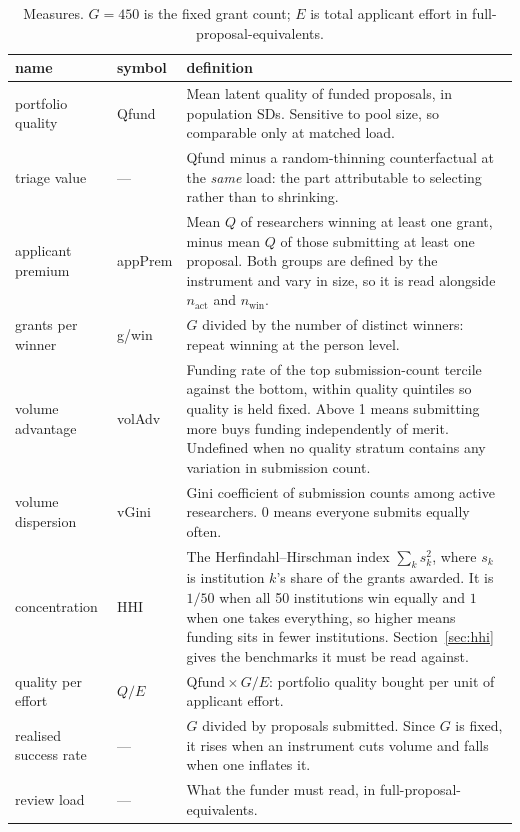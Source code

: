 \documentclass[11pt,a4paper]{article}
\begin{document}
\begin{table}[!htbp]
\centering
\small
\caption{Measures. $G=450$ is the fixed grant count; $E$ is total applicant
effort in full-proposal-equivalents.}
\label{tab:metrics}
\begin{tabular}{ll p{9.4cm}}
\toprule
name & symbol & definition \\
\midrule
portfolio quality & Qfund
  & Mean latent quality of funded proposals, in population SDs. Sensitive to
    pool size, so comparable only at matched load. \\
triage value & ---
  & Qfund minus a random-thinning counterfactual at the \emph{same} load: the
    part attributable to selecting rather than to shrinking. \\
applicant premium & appPrem
  & Mean $Q$ of researchers winning at least one grant, minus mean $Q$ of those
    submitting at least one proposal. Both groups are defined by the instrument
    and vary in size, so it is read alongside $n_{\text{act}}$ and
    $n_{\text{win}}$. \\
grants per winner & g/win
  & $G$ divided by the number of distinct winners: repeat winning at the person
    level. \\
volume advantage & volAdv
  & Funding rate of the top submission-count tercile against the bottom, within
    quality quintiles so quality is held fixed. Above 1 means submitting more
    buys funding independently of merit. Undefined when no quality stratum
    contains any variation in submission count. \\
volume dispersion & vGini
  & Gini coefficient of submission counts among active researchers. $0$ means
    everyone submits equally often. \\
concentration & HHI
  & The Herfindahl--Hirschman index $\sum_k s_k^2$, where $s_k$ is institution
    $k$'s share of the grants awarded. It is $1/50$ when all 50 institutions win
    equally and $1$ when one takes everything, so higher means funding sits in
    fewer institutions. Section~\ref{sec:hhi} gives the benchmarks it must be read
    against. \\
quality per effort & $Q/E$
  & $\mathrm{Qfund}\times G/E$: portfolio quality bought per unit of applicant
    effort. \\
realised success rate & ---
  & $G$ divided by proposals submitted. Since $G$ is fixed, it rises when an
    instrument cuts volume and falls when one inflates it. \\
review load & ---
  & What the funder must read, in full-proposal-equivalents. \\
\bottomrule
\end{tabular}
\end{table}
\end{document}
